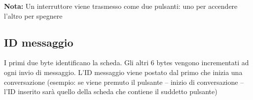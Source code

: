 \documentclass{article}
\begin{document}
%        
%        
%                
%        
%       
    
    \textbf{Nota:} Un interruttore viene trasmesso come due pulsanti: uno per accendere l'altro per spegnere
    
    \subsection*{ID messaggio}
    
    I primi due byte identificano la scheda. Gli altri 6 bytes vengono incrementati ad ogni invio di messaggio. L'ID messaggio viene postato dal primo che inizia una conversazione (esempio: se viene premuto il pulsante -- inizio di conversazione -- l'ID inserito sarà quello della scheda che contiene il suddetto pulsante)
    
\end{document}
